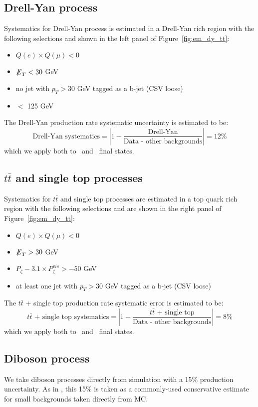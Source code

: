 \subsection{Drell-Yan process}\label{sec:em_DY}
Systematics for Drell-Yan process is estimated in a Drell-Yan rich 
region with the following selections and shown in the left panel of 
Figure~\ref{fig:em_dy_tt}:
\begin{itemize}
  \item $Q(e) \times Q(\mu) < 0$
  \item ${\not\mathrel{E}}_T<30$ GeV
  \item no jet with $p_T>30$ GeV tagged as a b-jet (CSV loose)
  \item \meffemu $<$ 125 GeV
\end{itemize}
The Drell-Yan production rate systematic uncertainty is estimated to
be:
\begin{equation}\label{eq:DY}
\text{Drell-Yan systematics} = \left| 1 - \frac{\text{Drell-Yan}}{\text{Data - other backgrounds}}\right| = 12\%
\end{equation}
which we apply both to \tetm ~and \teth ~final states.

\subsection{$t\bar{t}$ and single top processes}\label{sec:em_tt}
Systematics for $t\bar{t}$ and single top processes are estimated in a
top quark rich region with the following selections and are shown in the
right panel of Figure~\ref{fig:em_dy_tt}:
\begin{itemize}
  \item $Q(e) \times Q(\mu) < 0$
  \item ${\not\mathrel{E}}_T>30$ GeV
  \item $P_{\zeta}- 3.1 \times P_{\zeta}^{vis} > -50$ GeV
  \item at least one jet with $p_T>30$ GeV tagged as a b-jet (CSV loose)
\end{itemize}
The $t\bar{t}$ + single top production rate systematic error is estimated to be:
\begin{equation}\label{eq:em_tt}
\text{$t\bar{t}$ + single top systematics} = \left| 1 - \frac{\text{$t\bar{t}$ + single top}}{\text{Data - other backgrounds}}\right| = 8\%
\end{equation}
which we apply both to \tetm ~and \teth ~final states.

\subsection{Diboson process}
We take diboson processes directly from simulation with a 15\% production uncertainty. As in \teth , this 15\% is taken as a commonly-used conservative estimate for small backgrounds taken directly from MC.


